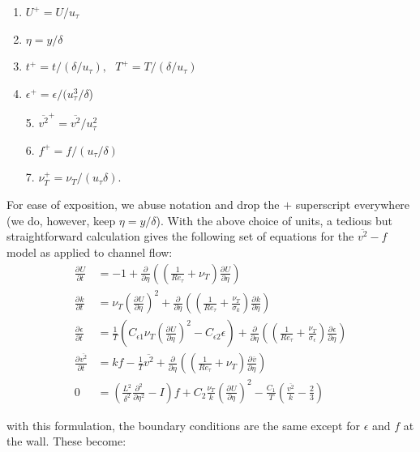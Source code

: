 \documentclass[a4paper,11pt]{article}
\newcommand{\pderiv}[3][]{%
  \ensuremath{\frac{\partial^{#1} {#2}}{\partial {#3}^{#1}}}}
\newcommand{\noi}{\noindent}
\newcommand{\ep}{\epsilon}
\begin{document}
\begin{multicols}{2}
\begin{enumerate}
\item $U^+ = U\big/u_{\tau}$
\item $\eta  = y\Big/\delta$
\item $t^+ = t\Big/(\delta/u_{\tau}), \,\,\,\, T^+ = T\Big/(\delta/u_{\tau})$
\item $\epsilon^+ = \epsilon\Big/(u_{\tau}^3/\delta$)
\end{enumerate}
\columnbreak 

\begin{itemize}
\item[5.] $\overline{v^2}^+ = \overline{v^2}\Big/u_{\tau}^2$
\item[6.] $f^+ = f\Big/(u_{\tau}/\delta)$
\item[7.] $\nu_T^+ = \nu_T\Big/(u_{\tau} \delta)$.

\end{itemize}
\end{multicols}
For ease of exposition, we abuse notation and drop the $+$ superscript everywhere (we do, however, keep $\eta = y/\delta$). With the above choice of units, a tedious but straightforward calculation gives the following set of equations for the $\overline{v^2}-f$ model as applied to channel flow: 
\begin{align}
	\label{eq:ssv2f1_nondim}
        \pderiv{U}{t} &= -1 +
\pderiv{}{\eta}\left(\left(\frac{1}{Re_{\tau}}+\nu_T\right)\pderiv{U}{\eta}\right) \\
        \pderiv{k}{t} &= \nu_T\left(\pderiv{U}{\eta}\right)^2 + 
\pderiv{}{\eta}\left(\left(\frac{1}{Re_{\tau}}+\frac{\nu_T}{\sigma_k}\right)\pderiv{k}{\eta}\right) \\
        \pderiv{\ep}{t} &= \frac{1}{T}\left(C_{\ep
1}\nu_T\left(\pderiv{U}{\eta}\right)^2 - C_{\ep 2}\ep\right) + 
\pderiv{}{\eta}\left(\left(\frac{1}{Re_{\tau}}+\frac{\nu_T}{\sigma_\ep}\right)\pderiv{\ep}{\eta}\right) \\
        \pderiv{\overline{v^2}}{t} &= kf - \frac{1}{T}\overline{v^2} +
\pderiv{}{\eta}\left(\left(\frac{1}{Re_{\tau}}+\nu_T\right)\pderiv{\overline{v}}{\eta}\right) \\
        0 &= \left( \frac{L^2}{\delta^2} \frac{\partial^2}{\partial \eta^2} - I\right)f +
C_2\frac{\nu_T}{k}\left(\pderiv{U}{\eta}\right)^2 -
\frac{C_1}{T}\left(\frac{\overline{v^2}}{k}-\frac{2}{3}\right)
	\label{eq:ssv2f5_nondim}
\end{align}

\noi with this formulation, the boundary conditions are the same except for
$\epsilon$ and $f$ at the wall. These become:  
\end{document}
